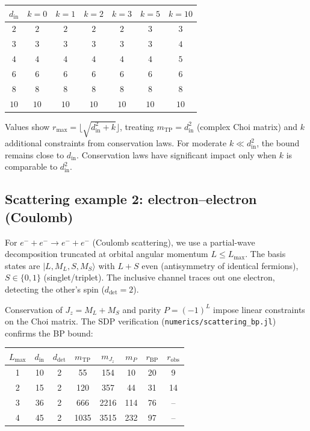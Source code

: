 \documentclass[11pt,a4paper]{article}
\theoremstyle{definition}
\newcommand{\ket}[1]{|#1\rangle}
\begin{document}
\medskip
\begin{center}
\begin{tabular}{c|cccccc}
\toprule
$d_{\mathrm{in}}$ & $k = 0$ & $k = 1$ & $k = 2$ & $k = 3$
  & $k = 5$ & $k = 10$ \\
\midrule
$2$  & $2$ & $2$ & $2$ & $2$ & $3$ & $3$ \\
$3$  & $3$ & $3$ & $3$ & $3$ & $3$ & $4$ \\
$4$  & $4$ & $4$ & $4$ & $4$ & $4$ & $5$ \\
$6$  & $6$ & $6$ & $6$ & $6$ & $6$ & $6$ \\
$8$  & $8$ & $8$ & $8$ & $8$ & $8$ & $8$ \\
$10$ & $10$& $10$& $10$& $10$& $10$& $10$\\
\bottomrule
\end{tabular}
\end{center}
\medskip

\noindent
Values show $r_{\max} = \lfloor\sqrt{d_{\mathrm{in}}^2 + k}\rfloor$,
treating $m_{\mathrm{TP}} = d_{\mathrm{in}}^2$ (complex Choi matrix)
and $k$ additional constraints from conservation laws.
For moderate $k \ll d_{\mathrm{in}}^2$, the bound remains close to
$d_{\mathrm{in}}$.  Conservation laws have significant impact only
when $k$ is comparable to $d_{\mathrm{in}}^2$.

\subsection{Scattering example 2: electron--electron (Coulomb)}
\label{sec:scatter-ee}

For $e^- + e^- \to e^- + e^-$ (Coulomb scattering), we use a
partial-wave decomposition truncated at orbital angular momentum
$L \leq L_{\max}$.  The basis states are
$\ket{L, M_L, S, M_S}$ with $L + S$ even (antisymmetry of identical
fermions), $S \in \{0, 1\}$ (singlet/triplet).  The inclusive
channel traces out one electron, detecting the other's spin ($d_{\mathrm{det}} = 2$).

Conservation of $J_z = M_L + M_S$ and parity $P = (-1)^L$ impose
linear constraints on the Choi matrix.  The SDP verification
(\texttt{numerics/scattering\_bp.jl}) confirms the BP bound:

\medskip
\begin{center}
\begin{tabular}{cccccccc}
\toprule
$L_{\max}$ & $d_{\mathrm{in}}$ & $d_{\mathrm{det}}$ & $m_{\mathrm{TP}}$
  & $m_{J_z}$ & $m_P$ & $r_{\mathrm{BP}}$ & $r_{\mathrm{obs}}$ \\
\midrule
1 & 10  & 2 & 55   & 154  & 10   & 20  & 9 \\
2 & 15  & 2 & 120  & 357  & 44   & 31  & 14 \\
3 & 36  & 2 & 666  & 2216 & 114  & 76  & -- \\
4 & 45  & 2 & 1035 & 3515 & 232  & 97  & -- \\
\bottomrule
\end{tabular}
\end{center}
\medskip
\end{document}
